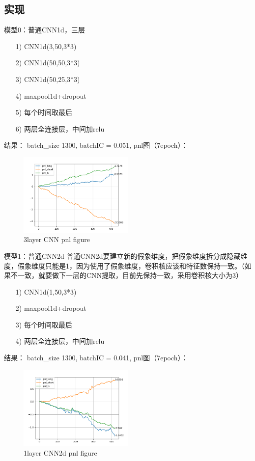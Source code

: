 \documentclass[11pt]{ctexart}
\begin{document}
\subsection{实现}
模型0：普通CNN1d，三层
\begin{itemize}
  \item [1)]
  CNN1d(3,50,3*3)
  \item [2)]
  CNN1d(50,50,3*3)
  \item [3)]
  CNN1d(50,25,3*3)
  \item [4)]
  maxpool1d+dropout
  \item [5)]
  每个时间取最后
  \item [6)]
  两层全连接层，中间加relu

\end{itemize}
结果： batch\_size 1300, batchIC = 0.051,
pnl图（7epoch）：
\begin{figure}[h!]
\begin{center}
\includegraphics[width=0.5\textwidth]{2.PNG}
\end{center}
\caption{3layer CNN pnl figure}
\label{FIG.1}
\end{figure}

模型1：普通CNN2d
普通CNN2d要建立新的假象维度，把假象维度拆分成隐藏维度，假象维度只能是1，因为使用了假象维度，卷积核应该和特征数保持一致。（如果不一致，就要做下一层的CNN提取，目前先保持一致，采用卷积核大小为3）
\begin{itemize}
  \item [1)]
  CNN1d(1,50,3*3)
  \item [2)]
  maxpool1d+dropout
  \item [3)]
  每个时间取最后
  \item [4)]
  两层全连接层，中间加relu

\end{itemize}
结果： batch\_size 1300, batchIC = 0.041,
pnl图（7epoch）：
\begin{figure}[h!]
\begin{center}
\includegraphics[width=0.5\textwidth]{1.PNG}
\end{center}
\caption{1layer CNN2d pnl figure}
\label{FIG.2}
\end{figure}
\end{document}
